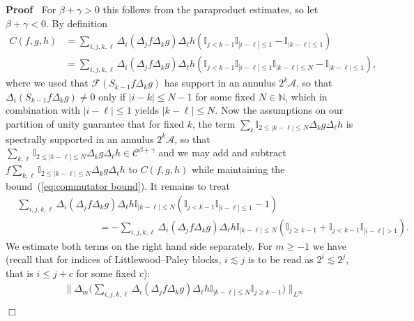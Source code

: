 \documentclass[a4paper,11pt]{article}
\newenvironment{proof}{\noindent\textbf{Proof\ }}{\hspace*{\fill}$\Box$\medskip}
\newcommand{\CA}{\mathscr{A}}
\newcommand{\CF}{\mathscr{F}}
\newcommand{\CC}{\mathscr{C}}
\begin{document}
\begin{proof}
  For $\beta + \gamma > 0$ this follows from the paraproduct estimates, so let
  $\beta + \gamma < 0$. By definition
  \begin{align*}
     C (f, g, h) & = \sum_{i, j, k, \ell} \Delta_i (\Delta_j f \Delta_k g) \Delta_{\ell} h (\mathbb{I}_{j < k - 1} \mathbb{I}_{| i - \ell | \leqslant 1} - \mathbb{I}_{| k - \ell | \leqslant 1}) \\
      & = \sum_{i, j, k, \ell} \Delta_i (\Delta_j f \Delta_k g) \Delta_{\ell} h (\mathbb{I}_{j < k - 1} \mathbb{I}_{| i - \ell | \leqslant 1}\mathbb{I}_{| k - \ell | \leqslant N} - \mathbb{I}_{| k - \ell |\leqslant 1}),
  \end{align*}
  where we used that $\CF(S_{k - 1} f \Delta_k g)$ has support in an annulus $2^k
  \CA$, so that $\Delta_i (S_{k - 1} f \Delta_k g) \neq 0$ only if $| i - k |
  \leqslant N - 1$ for some fixed $N \in \mathbb{N}$, which in combination
  with $| i - \ell | \leqslant 1$ yields $| k - \ell | \leqslant N$. Now the assumptions on our partition of unity guarantee that for
  fixed $k$, the term $\sum_{\ell} \mathbb{I}_{2 \leqslant | k - \ell |
  \leqslant N} \Delta_k g \Delta_{\ell} h$ is spectrally supported in an
  annulus $2^k \CA$, so that $\sum_{k, \ell} \mathbb{I}_{2 \leqslant | k -
  \ell | \leqslant N} \Delta_k g \Delta_{\ell} h \in \CC^{\beta + \gamma}$ and
  we may add and subtract $f \sum_{k, \ell} \mathbb{I}_{2 \leqslant | k -
  \ell | \leqslant N} \Delta_k g \Delta_{\ell} h$ to $C (f, g, h)$ while
  maintaining the bound~(\ref{eq:commutator bound}). It remains to treat
  \begin{align}\label{eq:commutator pr1} \nonumber
     &\sum_{i, j, k, \ell} \Delta_i  (\Delta_j f \Delta_k g) \Delta_{\ell} h \mathbb{I}_{| k - \ell | \leqslant N} (\mathbb{I}_{j < k - 1} \mathbb{I}_{| i - \ell | \leqslant 1} - 1) \\
     &\hspace{100pt} = - \sum_{i, j, k, \ell} \Delta_i  (\Delta_j f \Delta_k g) \Delta_{\ell} h \mathbb{I}_{| k - \ell | \leqslant N}(\mathbb{I}_{j \geqslant k - 1} + \mathbb{I}_{j < k - 1}\mathbb{I}_{| i - \ell | > 1}) .
  \end{align}
  We estimate both terms on the right hand side separately. For $m \geqslant - 1$ we have (recall that for indices of Littlewood--Paley blocks, $i \lesssim j$ is to be read as $2^i \lesssim 2^j$, that is $i \le j + c$ for some fixed $c$):
  \begin{align*}
     &\Big\| \Delta_m \Big( \sum_{i, j, k, \ell} \Delta_i  (\Delta_j f \Delta_k g) \Delta_{\ell} h \mathbb{I}_{| k - \ell | \leqslant N} \mathbb{I}_{j \geqslant k - 1} \Big) \Big\|_{L^{\infty}} \\

\end{align*}
\end{proof}
\end{document}

